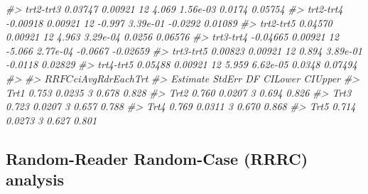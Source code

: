 \documentclass[
]{book}
\newenvironment{Shaded}{\begin{snugshade}}{\end{snugshade}}
\newcommand{\CommentTok}[1]{\textcolor[rgb]{0.56,0.35,0.01}{\textit{#1}}}
\begin{document}
\begin{Shaded}
\begin{Highlighting}[]
\CommentTok{\#\textgreater{} trt2{-}trt3  0.03747 0.00921 12  4.069 1.56e{-}03  0.0174  0.05754}
\CommentTok{\#\textgreater{} trt2{-}trt4 {-}0.00918 0.00921 12 {-}0.997 3.39e{-}01 {-}0.0292  0.01089}
\CommentTok{\#\textgreater{} trt2{-}trt5  0.04570 0.00921 12  4.963 3.29e{-}04  0.0256  0.06576}
\CommentTok{\#\textgreater{} trt3{-}trt4 {-}0.04665 0.00921 12 {-}5.066 2.77e{-}04 {-}0.0667 {-}0.02659}
\CommentTok{\#\textgreater{} trt3{-}trt5  0.00823 0.00921 12  0.894 3.89e{-}01 {-}0.0118  0.02829}
\CommentTok{\#\textgreater{} trt4{-}trt5  0.05488 0.00921 12  5.959 6.62e{-}05  0.0348  0.07494}
\CommentTok{\#\textgreater{} }
\CommentTok{\#\textgreater{} $RRFC$ciAvgRdrEachTrt}
\CommentTok{\#\textgreater{}      Estimate StdErr DF CILower CIUpper}
\CommentTok{\#\textgreater{} Trt1    0.753 0.0235  3   0.678   0.828}
\CommentTok{\#\textgreater{} Trt2    0.760 0.0207  3   0.694   0.826}
\CommentTok{\#\textgreater{} Trt3    0.723 0.0207  3   0.657   0.788}
\CommentTok{\#\textgreater{} Trt4    0.769 0.0311  3   0.670   0.868}
\CommentTok{\#\textgreater{} Trt5    0.714 0.0273  3   0.627   0.801}
\end{Highlighting}
\end{Shaded}

\hypertarget{ORApplications-RRRC-dataset04-FROC}{%
\subsection{Random-Reader Random-Case (RRRC) analysis}\label{ORApplications-RRRC-dataset04-FROC}}
\end{document}

